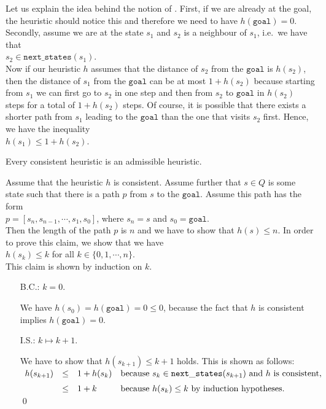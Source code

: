 Let us explain the idea behind the notion of .  First, if we are already at the goal, the heuristic
should notice this and therefore we need to have $h(\mathtt{goal}) = 0$.  Secondly, assume we are at the state
$s_1$ and $s_2$ is a neighbour of $s_1$, i.e.~we have that
\\[0.2cm]
\hspace*{1.3cm}
$s_2 \in \mathtt{next\_states}(s_1)$.
\\[0.2cm]
Now if our heuristic $h$ assumes that the distance of $s_2$ from the $\texttt{goal}$ is $h(s_2)$, then the distance of
$s_1$ from the $\texttt{goal}$ can be at most $1 + h(s_2)$ because starting from $s_1$ we can first go to $s_2$
in one step and then from $s_2$ to $\texttt{goal}$ in $h(s_2)$ steps for a total of $1 + h(s_2)$ steps.  Of
course, it is possible that there exists a shorter path from $s_1$ leading to the $\texttt{goal}$ than the one
that visits $s_2$ first.  Hence, we have the inequality
\\[0.2cm]
\hspace*{1.3cm}
$h(s_1) \leq 1 + h(s_2)$.

\begin{Theorem}
  Every consistent heuristic is an admissible heuristic.
\end{Theorem}

\proof
Assume that the heuristic $h$ is consistent.  Assume further that $s \in Q$ is some state such that there is a
path $p$ from $s$ to the $\texttt{goal}$.  Assume this path has the form
\\[0.2cm]
\hspace*{1.3cm}
$p = [s_n, s_{n-1}, \cdots, s_1, s_0]$, \quad where $s_n = s$ and $s_0 = \mathtt{goal}$.
\\[0.2cm]
Then the length of the path $p$ is $n$ and we have to show that $h(s) \leq n$.  In order to prove this claim, we show
that we have
\\[0.2cm]
\hspace*{1.3cm}
$h(s_k) \leq k$ \quad for all $k \in \{0, 1, \cdots, n\}$.
\\[0.2cm]
This claim is shown by induction on $k$.
\begin{enumerate}
\item[B.C.:] $k=0$.

             We have $h(s_0) = h(\mathtt{goal}) = 0 \leq 0$, because the fact that $h$ is consistent implies
             $h(\mathtt{goal}) = 0$.
\item[I.S.:] $k \mapsto k+1$.

             We have to show that $h(s_{k+1}) \leq k + 1$ holds.  This is shown as follows:
             \\[0.2cm]
             \hspace*{1.3cm}
             $
             \begin{array}[b]{lcll}
               h(s_{k+1}) & \leq & 1 + h(s_k) & \mbox{because $s_k \in \mathtt{next\_states}(s_{k+1})$ and $h$ is consistent,} \\[0.2cm]
                         & \leq & 1 + k      & \mbox{because $h(s_k) \leq k$ by induction hypotheses.} 
             \end{array}
             $ 
             \qed
\end{enumerate}

